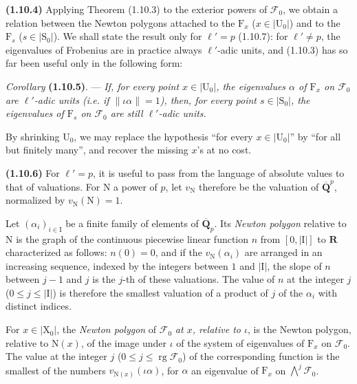 \documentclass[11pt,leqno]{article}
\begin{document}
\textbf{(1.10.4)} Applying Theorem (1.10.3) to the exterior powers of \(\mathscr{F}_0\), we obtain a relation between the Newton polygons attached to the \(\mathrm{F}_x\) (\(x\in\lvert\mathrm{U}_0\rvert\)) and to the \(\mathrm{F}_s\) (\(s\in\lvert\mathrm{S}_0\rvert\)). We shall state the result only for \(\ell'=p\) (1.10.7): for \(\ell'\neq p\), the eigenvalues of Frobenius are in practice always \(\ell'\)-adic units, and (1.10.3) has so far been useful only in the following form:

\textit{Corollary} \textbf{(1.10.5)}. — \textit{If, for every point \(x\in\lvert\mathrm{U}_0\rvert\), the eigenvalues \(\alpha\) of \(\mathrm{F}_x\) on \(\mathscr{F}_0\) are \(\ell'\)-adic units (\textup{i.e.} if \(\lVert\iota\alpha\rVert=1\)), then, for every point \(s\in\lvert\mathrm{S}_0\rvert\), the eigenvalues of \(\mathrm{F}_s\) on \(\mathscr{F}_0\) are still \(\ell'\)-adic units.}

By shrinking \(\mathrm{U}_0\), we may replace the hypothesis “for every \(x\in\lvert\mathrm{U}_0\rvert\)” by “for all but finitely many”, and recover the missing \(x\)'s at no cost.

\textbf{(1.10.6)} For \(\ell'=p\), it is useful to pass from the language of absolute values to that of valuations. For \(\mathrm{N}\) a power of \(p\), let \(v_{\mathrm{N}}\) therefore be the valuation of \(\overline{\mathbf{Q}}^{p}\), normalized by \(v_{\mathrm{N}}(\mathrm{N})=1\).

Let \((\alpha_i)_{i\in\mathrm{I}}\) be a finite family of elements of \(\overline{\mathbf{Q}}_p\). Its \textit{Newton polygon} relative to \(\mathrm{N}\) is the graph of the continuous piecewise linear function \(n\) from \([0,\lvert\mathrm{I}\rvert]\) to \(\mathbf{R}\) characterized as follows: \(n(0)=0\), and if the \(v_{\mathrm{N}}(\alpha_i)\) are arranged in an increasing sequence, indexed by the integers between \(1\) and \(\lvert\mathrm{I}\rvert\), the slope of \(n\) between \(j-1\) and \(j\) is the \(j\)-th of these valuations. The value of \(n\) at the integer \(j\) (\(0\leq j\leq\lvert\mathrm{I}\rvert\)) is therefore the smallest valuation of a product of \(j\) of the \(\alpha_i\) with distinct indices.

For \(x\in\lvert\mathrm{X}_0\rvert\), the \textit{Newton polygon} of \(\mathscr{F}_0\) \textit{at \(x\), relative to \(\iota\)}, is the Newton polygon, relative to \(\mathrm{N}(x)\), of the image under \(\iota\) of the system of eigenvalues of \(\mathrm{F}_x\) on \(\mathscr{F}_0\). The value at the integer \(j\) (\(0\leq j\leq\operatorname{rg}\mathscr{F}_0\)) of the corresponding function is the smallest of the numbers \(v_{\mathrm{N}(x)}(\iota\alpha)\), for \(\alpha\) an eigenvalue of \(\mathrm{F}_x\) on \(\bigwedge\limits^{j}\mathscr{F}_0\).
\end{document}
